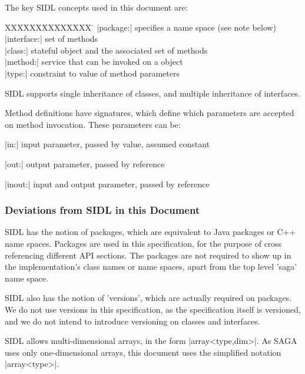   The key SIDL concepts used in this document are:
  \upp
  
   \begin{tabbing}
     XXXXXXXXXXXXXX       \= \kill
     \shift |package:|    \> specifies a name space (see note below)\\
     \shift |interface:|  \> set of methods\\
     \shift |class:|      \> stateful object and the associated set of methods\\
     \shift |method:|     \> service that can be invoked on a object\\
     \shift |type:|       \> constraint to value of method parameters\\
   \end{tabbing}

  \up\upp
  SIDL supports single inheritance of classes, and multiple
  inheritance of interfaces.  
  
  Method definitions have signatures, which define which
  parameters are accepted on method invocation.  These
  parameters can be:

   \begin{shortlist}
     \item |in:|    input parameter, passed by value, assumed 
                    constant
     \item |out:|   output parameter, passed by reference
     \item |inout:| input and output parameter, passed by reference
   \end{shortlist}


  \subsubsection{Deviations from SIDL in this Document}

   SIDL has the notion of packages, which are equivalent to Java
   packages or C++ name spaces.  Packages are used in this
   specification, for the purpose of cross referencing different
   API sections.  The packages are not required to show up
   in the implementation's class names or name spaces,
   apart from the top level 'saga' name space.

   SIDL also has the notion of 'versions', which are actually
   required on packages.  We do not use versions in this
   specification, as the specification itself is versioned, and
   we do not intend to introduce versioning on classes and
   interfaces.

   SIDL allows multi-dimensional arrays, in the form
   |array<type,dim>|.  As SAGA uses only one-dimensional arrays,
   this document uses the simplified notation |array<type>|.

